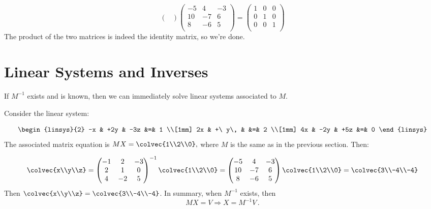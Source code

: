 \begin{example}
\[\begin{pmatrix}
\end{pmatrix}\begin{pmatrix}
-5 & 4 & -3 \\
10 & -7 & 6 \\
 8 & -6 & 5 \\
\end{pmatrix}
=\begin{pmatrix}
1 & 0 & 0 \\
0 & 1 & 0 \\
0 & 0 & 1 \\
\end{pmatrix}
\]  
The product of the two matrices is indeed the identity matrix, so we're done.
\end{example}

\section{Linear Systems and Inverses}

If $M^{-1}$ exists and is known, then we can immediately solve linear systems associated to $M$.

\begin{example}
Consider the linear system:

\[
      \begin{linsys}{2}
            -x & +2y & -3z         &=& 1  \\[1mm]
            2x & +\ y\,   &             &=& 2 \\[1mm]
            4x & -2y & +5z         &=& 0  
      \end{linsys}
\]
The associated matrix equation is $MX=\colvec{1\\2\\0},$ where \(M\) is the same as in the previous section.  Then:

\[
\colvec{x\\y\\z}=\begin{pmatrix}
-1 & 2 & -3 \\
2 & 1 & 0 \\
4 & -2 & 5 \\
\end{pmatrix}^{-1}\colvec{1\\2\\0}
=\begin{pmatrix}
-5 & 4 & -3 \\
10 & -7 & 6 \\
 8 & -6 & 5 \\
\end{pmatrix}\colvec{1\\2\\0}
=\colvec{3\\-4\\-4}
\]
Then $\colvec{x\\y\\z}=\colvec{3\\-4\\-4}$.  
In summary, when $M^{-1}$ exists, then $$MX=V \Rightarrow X=M^{-1}V\, .$$
\end{example}



